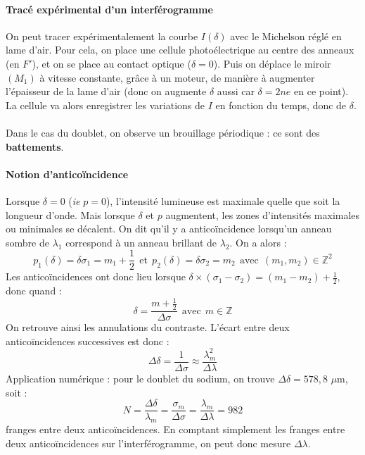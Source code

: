 \documentclass[french]{book}
\theoremstyle{plain}
\theoremstyle{definition}
\theoremstyle{remark}
\newcommand{\Z}{\mathbb{Z}}
\begin{document}
\paragraph{Tracé expérimental d'un interférogramme}
On peut tracer expérimentalement la courbe $I(\delta)$ avec le Michelson réglé en lame d'air. Pour cela, on place une cellule photoélectrique au centre des anneaux (en $F'$), et on se place au contact optique ($\delta=0$). Puis on déplace le miroir $(M_1)$ à vitesse constante, grâce à un moteur, de manière à augmenter l'épaisseur de la lame d'air (donc on augmente $\delta$ aussi car $\delta=2ne$ en ce point). La cellule va alors enregistrer les variations de $I$ en fonction du temps, donc de $\delta$. \\ \\ Dans le cas du doublet, on observe un brouillage périodique : ce sont des \textbf{battements}.
\paragraph{Notion d'anticoïncidence} Lorsque $\delta=0$ (\textit{ie} $p=0$), l'intensité lumineuse est maximale quelle que soit la longueur d'onde. Mais lorsque $\delta$ et $p$ augmentent, les zones d'intensités maximales ou minimales se décalent. On dit qu'il y a anticoïncidence lorsqu'un anneau sombre de $\lambda_1$ correspond à un anneau brillant de $\lambda_2$. On a alors : $$p_1(\delta)=\delta\sigma_1=m_1+\frac{1}{2} \ \ \text{et} \ \ p_2(\delta)=\delta\sigma_2=m_2 \ \ \text{avec} \ \ (m_1,m_2)\in\Z^2$$ Les anticoïncidences ont donc lieu lorsque $\displaystyle\delta\times(\sigma_1-\sigma_2)=(m_1-m_2)+\frac{1}{2}$, donc quand : $$\delta=\frac{m+\frac{1}{2}}{\Delta\sigma} \ \ \text{avec} \ \ m\in\Z$$ On retrouve ainsi les annulations du contraste. L'écart entre deux anticoïncidences successives est donc : $$\Delta\delta=\frac{1}{\Delta\sigma}\approx\frac{\lambda_m^2}{\Delta\lambda}$$ Application numérique : pour le doublet du sodium, on trouve $\Delta\delta=578,8$ $\mu$m, soit : $$N=\frac{\Delta\delta}{\lambda_m}=\frac{\sigma_m}{\Delta\sigma}=\frac{\lambda_m}{\Delta\lambda}=982$$ franges entre deux anticoïncidences. En comptant simplement les franges entre deux anticoïncidences sur l'interférogramme, on peut donc mesure $\Delta\lambda$.
\end{document}
